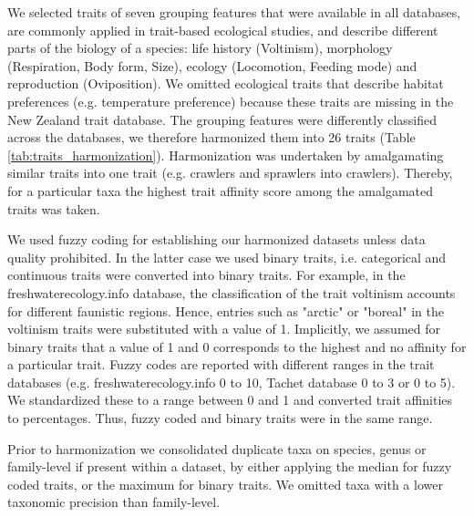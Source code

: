 \documentclass{article}
\begin{document}
We selected traits of seven grouping features that were available in all databases, are commonly applied in trait-based ecological studies, and describe different parts of the biology of a species: life history (Voltinism), morphology (Respiration, Body form, Size), ecology (Locomotion, Feeding mode) and reproduction (Oviposition). We omitted ecological traits that describe habitat preferences (e.g. temperature preference) because these traits are missing in the New Zealand trait database. The grouping features were differently classified across the databases, we therefore harmonized them into 26 traits (Table \ref{tab:traits_harmonization}). Harmonization was undertaken by amalgamating similar traits into one trait (e.g. crawlers and sprawlers into crawlers). Thereby, for a particular taxa the highest trait affinity score among the amalgamated traits was taken. 

We used fuzzy coding for establishing our harmonized datasets unless data quality prohibited. In the latter case we used binary traits, i.e. categorical and continuous traits were converted into binary traits. For example, in the  freshwaterecology.info database, the classification of the trait voltinism accounts for different faunistic regions. Hence, entries such as "arctic" or "boreal" in the voltinism traits were substituted with a value of 1. Implicitly, we assumed for binary traits that a value of 1 and 0 corresponds to the highest and no affinity for a particular trait. Fuzzy codes are reported with different ranges in the trait databases (e.g. freshwaterecology.info 0 to 10, Tachet database 0 to 3 or 0 to 5). We standardized these to a range between 0 and 1 and converted trait affinities to percentages. Thus, fuzzy coded and binary traits were in the same range. 

Prior to harmonization we consolidated duplicate taxa on species, genus or family-level if present within a dataset, by either applying the median for fuzzy coded traits, or the maximum for binary traits. We omitted taxa with a lower taxonomic precision than family-level.
\end{document}
